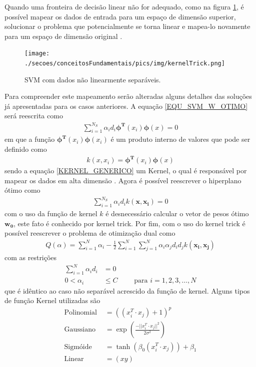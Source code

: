 Quando uma fronteira de decisão linear não for adequado, como na figura \ref{FIGURA_SVM_Caso_Nao_Separavel_KERNEL_TRICK}, é possível mapear os dados de entrada para um espaço de dimensão superior, solucionar o problema que potencialmente se torna linear e mapea-lo novamente para um espaço de dimensão original \cite{Haykin2007}.
\begin{figure}[hbt]
  \centering
  \caption{SVM com dados não linearmente separáveis.}
  \texttt{[image: ./secoes/conceitosFundamentais/pics/img/kernelTrick.png]}
  \label{FIGURA_SVM_Caso_Nao_Separavel_KERNEL_TRICK}
\end{figure}
Para compreender este mapeamento serão alteradas alguns detalhes das soluções já apresentadas para os casos anteriores. A equação \eqref{EQU_SVM_W_OTIMO} será reescrita como
\begin{align}
\sum\limits_{i=1}^{N_{S}} \alpha_{i}d_{i}\mathbf{\phi^{T}}(x_{i})\mathbf{\phi}(x) = 0
\end{align}
em que a função \(\mathbf{\phi^{T}}(x_{i})\mathbf{\phi}(x_{i})\) é um produto interno de valores que pode ser definido como
\begin{align}
k(x, x_{i}) = \mathbf{\phi^{T}}(x_{i})\mathbf{\phi}(x) \label{KERNEL_GENERICO}
\end{align}
sendo a equação \eqref{KERNEL_GENERICO} um Kernel, o qual é responsável por mapear os dados em alta dimensão \cite{Shawe2004}. Agora é possível reescrever o hiperplano ótimo como
\begin{align}
\sum\limits_{i=1}^{N_{S}} \alpha_{i}d_{i}k(\mathbf{x}, \mathbf{x_{i}}) = 0
\end{align}
com o uso da função de kernel \(k\) é desnecessário calcular o vetor de pesos ótimo \(\mathbf{w_{0}}\), este fato é conhecido por kernel trick. Por fim, com o uso do kernel trick é possível reescrever o problema de otimização dual como
\begin{align}
Q(\alpha) = \sum\limits_{i=1}^{N} \alpha_{i} - \frac{1}{2} \sum\limits_{i=1}^{N} \sum\limits_{j=1}^{N} \alpha_{i}\alpha_{j}d_{i}d_{j} k(\mathbf{x_{i}}, \mathbf{x_{j}})
\end{align}
com as restrições
\begin{align}
\sum\limits_{i=1}^{N} \alpha_{i}d_{i} &= 0 \\
0 < \alpha_{i} &\leq C	\qquad \textrm{ para } i = 1, 2, 3, \ldots, N
\end{align}
que é idêntico ao caso não separável acrescido da função de kernel. Alguns tipos de função Kernel utilizadas \cite{Haykin2007} são
\begin{align}
\textrm{Polinomial } &= ((x_{i}^{T} \cdot x_{j})+1)^{p}								\\
\textrm{Gaussiano }  &= \exp(\frac{-||x_{i}^{T} \cdot x_{j}||^{2}}{2\sigma^{2}})	\\
\textrm{Sigmóide }   &= \tanh(\beta_{0} (x_{i}^{T} \cdot x_{j})) +  \beta_{1} 		\\
\textrm{Linear }   &= (xy)
\end{align}


